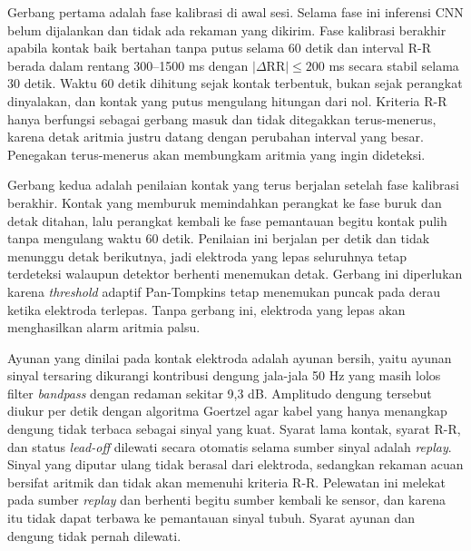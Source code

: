 Gerbang pertama adalah fase kalibrasi di awal sesi. Selama fase ini inferensi
CNN belum dijalankan dan tidak ada rekaman yang dikirim. Fase kalibrasi berakhir
apabila kontak baik bertahan tanpa putus selama 60 detik dan interval R-R berada
dalam rentang 300--1500 ms dengan $|\Delta \mathrm{RR}| \leq 200$ ms secara
stabil selama 30 detik. Waktu 60 detik dihitung sejak kontak terbentuk, bukan
sejak perangkat dinyalakan, dan kontak yang putus mengulang hitungan dari nol.
Kriteria R-R hanya berfungsi sebagai gerbang masuk dan tidak ditegakkan
terus-menerus, karena detak aritmia justru datang dengan perubahan interval yang
besar. Penegakan terus-menerus akan membungkam aritmia yang ingin dideteksi.

Gerbang kedua adalah penilaian kontak yang terus berjalan setelah fase
kalibrasi berakhir. Kontak yang memburuk memindahkan perangkat ke fase buruk dan
detak ditahan, lalu perangkat kembali ke fase pemantauan begitu kontak pulih
tanpa mengulang waktu 60 detik. Penilaian ini berjalan per detik dan tidak
menunggu detak berikutnya, jadi elektroda yang lepas seluruhnya tetap terdeteksi
walaupun detektor berhenti menemukan detak. Gerbang ini diperlukan karena
\textit{threshold} adaptif Pan-Tompkins tetap menemukan puncak pada derau ketika
elektroda terlepas. Tanpa gerbang ini, elektroda yang lepas akan menghasilkan
alarm aritmia palsu.

Ayunan yang dinilai pada kontak elektroda adalah ayunan bersih, yaitu ayunan sinyal tersaring dikurangi kontribusi dengung jala-jala 50 Hz yang masih lolos filter \textit{bandpass} dengan redaman sekitar 9,3 dB. Amplitudo dengung tersebut diukur per detik dengan algoritma Goertzel agar kabel yang hanya menangkap dengung tidak terbaca sebagai sinyal yang kuat. Syarat lama kontak, syarat R-R, dan status \textit{lead-off} dilewati secara otomatis selama sumber sinyal adalah \textit{replay}. Sinyal yang diputar ulang tidak berasal dari elektroda, sedangkan rekaman acuan bersifat aritmik dan tidak akan memenuhi kriteria R-R. Pelewatan ini melekat pada sumber \textit{replay} dan berhenti begitu sumber kembali ke sensor, dan karena itu tidak dapat terbawa ke pemantauan sinyal tubuh. Syarat ayunan dan dengung tidak pernah dilewati.

